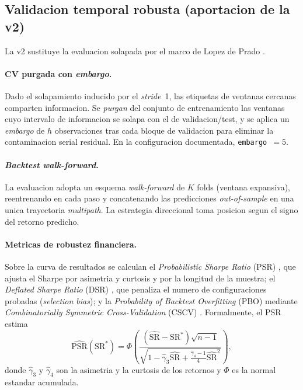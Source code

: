 \documentclass[preprint,12pt,3p]{elsarticle}
\begin{document}
\subsection{Validacion temporal robusta (aportacion de la v2)}
\label{sec:validacion}
La v2 sustituye la evaluacion solapada por el marco de Lopez de Prado
\cite{lopezdeprado2018advances}.

\paragraph{CV purgada con \emph{embargo}.} Dado el solapamiento inducido por el
\emph{stride}~1, las etiquetas de ventanas cercanas comparten informacion. Se
\emph{purgan} del conjunto de entrenamiento las ventanas cuyo intervalo de
informacion se solapa con el de validacion/test, y se aplica un \emph{embargo} de
$h$ observaciones tras cada bloque de validacion para eliminar la contaminacion
serial residual. En la configuracion documentada, \texttt{embargo}~$=5$.

\paragraph{\emph{Backtest walk-forward}.} La evaluacion adopta un esquema
\emph{walk-forward} de $K$ folds (ventana expansiva), reentrenando en cada paso y
concatenando las predicciones \emph{out-of-sample} en una unica trayectoria
\emph{multipath}. La estrategia direccional toma posicion segun el signo del
retorno predicho.

\paragraph{Metricas de robustez financiera.} Sobre la curva de resultados se
calculan el \emph{Probabilistic Sharpe Ratio} (PSR) \cite{bailey2012sharpe}, que
ajusta el Sharpe por asimetria y curtosis y por la longitud de la muestra; el
\emph{Deflated Sharpe Ratio} (DSR) \cite{bailey2014deflated}, que penaliza el
numero de configuraciones probadas (\emph{selection bias}); y la
\emph{Probability of Backtest Overfitting} (PBO) mediante
\emph{Combinatorially Symmetric Cross-Validation} (CSCV)
\cite{bailey2017probability}. Formalmente, el PSR estima
\begin{equation}
\widehat{\mathrm{PSR}}(\mathrm{SR}^{*}) =
\Phi\!\left( \frac{(\widehat{\mathrm{SR}} - \mathrm{SR}^{*})\sqrt{n-1}}
{\sqrt{1 - \hat{\gamma}_3 \widehat{\mathrm{SR}} +
\frac{\hat{\gamma}_4 - 1}{4}\widehat{\mathrm{SR}}^2}} \right),
\end{equation}
donde $\hat{\gamma}_3$ y $\hat{\gamma}_4$ son la asimetria y la curtosis de los
retornos y $\Phi$ es la normal estandar acumulada.
\end{document}
